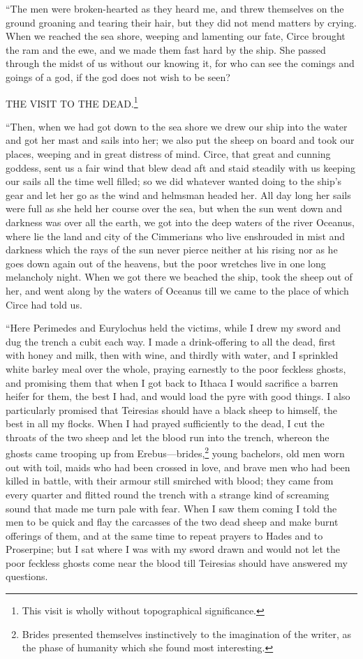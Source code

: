 “The men were broken-hearted as they heard me, and threw themselves on the
ground groaning and tearing their hair, but they did not mend matters by
crying. When we reached the sea shore, weeping and lamenting our fate, Circe
brought the ram and the ewe, and we made them fast hard by the ship. She passed
through the midst of us without our knowing it, for who can see the comings and
goings of a god, if the god does not wish to be seen?


THE VISIT TO THE DEAD.\footnote{This visit is wholly without topographical significance.}

“Then, when we had got down to the sea shore we drew our ship into the water
and got her mast and sails into her; we also put the sheep on board and took
our places, weeping and in great distress of mind. Circe, that great and
cunning goddess, sent us a fair wind that blew dead aft and staid steadily with
us keeping our sails all the time well filled; so we did whatever wanted doing
to the ship’s gear and let her go as the wind and helmsman headed her. All day
long her sails were full as she held her course over the sea, but when the sun
went down and darkness was over all the earth, we got into the deep waters of
the river Oceanus, where lie the land and city of the Cimmerians who live
enshrouded in mist and darkness which the rays of the sun never pierce neither
at his rising nor as he goes down again out of the heavens, but the poor
wretches live in one long melancholy night. When we got there we beached the
ship, took the sheep out of her, and went along by the waters of Oceanus till
we came to the place of which Circe had told us.

“Here Perimedes and Eurylochus held the victims, while I drew my sword and dug
the trench a cubit each way. I made a drink-offering to all the dead, first
with honey and milk, then with wine, and thirdly with water, and I sprinkled
white barley meal over the whole, praying earnestly to the poor feckless
ghosts, and promising them that when I got back to Ithaca I would sacrifice a
barren heifer for them, the best I had, and would load the pyre with good
things. I also particularly promised that Teiresias should have a black sheep
to himself, the best in all my flocks. When I had prayed sufficiently to the
dead, I cut the throats of the two sheep and let the blood run into the trench,
whereon the ghosts came trooping up from Erebus—brides,\footnote{Brides presented themselves instinctively to the imagination of the writer,
as the phase of humanity which she found most interesting.} young bachelors, old men worn out
with toil, maids who had been crossed in love, and brave men who had been
killed in battle, with their armour still smirched with blood; they came from
every quarter and flitted round the trench with a strange kind of screaming
sound that made me turn pale with fear. When I saw them coming I told the men
to be quick and flay the carcasses of the two dead sheep and make burnt
offerings of them, and at the same time to repeat prayers to Hades and to
Proserpine; but I sat where I was with my sword drawn and would not let the
poor feckless ghosts come near the blood till Teiresias should have answered my
questions.

